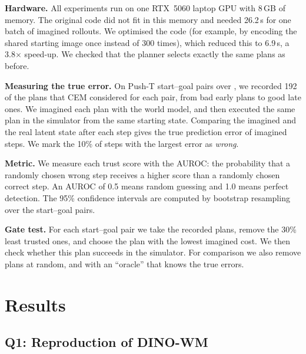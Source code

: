 \documentclass[conference]{IEEEtran}
\begin{document}
\textbf{Hardware.} All experiments run on one RTX~5060 laptop GPU with 8\,GB of memory. The original code did not fit
in this memory and needed 26.2\,s for one batch of imagined rollouts. We optimised the code (for example, by encoding the
shared starting image once instead of 300 times), which reduced this to 6.9\,s, a 3.8$\times$ speed-up. We checked that
the planner selects exactly the same plans as before.

\textbf{Measuring the true error.} On \HEpisodes{} Push-T start--goal pairs over \HSeedWord{}, we recorded 192 of the
plans that CEM considered for each pair, from bad early plans to good late ones. We imagined each plan with the world
model, and then executed the same plan in the simulator from the same starting state. Comparing the imagined and the
real latent state after each step gives the true prediction error of \HPairs{} imagined steps. We mark the 10\% of steps
with the largest error as \emph{wrong}.

\textbf{Metric.} We measure each trust score with the AUROC: the probability that a randomly chosen wrong step receives
a higher score than a randomly chosen correct step. An AUROC of 0.5 means random guessing and 1.0 means perfect
detection. The 95\% confidence intervals are computed by bootstrap resampling over the start--goal pairs.

\textbf{Gate test.} For each start--goal pair we take the recorded plans, remove the 30\% least trusted ones, and choose
the plan with the lowest imagined cost. We then check whether this plan succeeds in the simulator. For comparison we
also remove plans at random, and with an ``oracle'' that knows the true errors.

\section{Results}

\subsection{Q1: Reproduction of DINO-WM}

\begin{table}[t]
\caption{Planning success over 50 start--goal pairs per seed (mean $\pm$ standard deviation over seeds).}
\label{tab:phase0}
\centering
\setlength{\tabcolsep}{3pt}
\resizebox{\columnwidth}{!}{}
\end{table}
\end{document}
